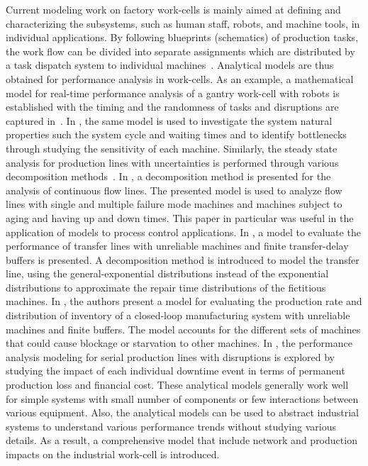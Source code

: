 Current modeling work on factory work-cells is mainly aimed at defining and characterizing the subsystems, such as human staff, robots, and machine tools, in individual applications. By following blueprints (schematics) of production tasks, the work flow can be divided into separate assignments which are distributed by a task dispatch system to individual machines~\cite{IkeaBot}. Analytical models are thus obtained for performance analysis in work-cells. As an example, a mathematical model for real-time performance analysis of a gantry work-cell with robots is established with the timing and the randomness of tasks and disruptions are captured in~\cite{8098604}. In \cite{Ou2017}, the same model is used to investigate the system natural properties such the system cycle and waiting times and to identify bottlenecks through studying the sensitivity of each machine. Similarly, the steady state analysis for production lines with uncertainties is performed through various decomposition methods~\cite{Colledani2013,doi:10.1080/00207543.2012.713137,doi:10.1080/00207540500385980}. In \cite{Colledani2013}, a decomposition method is presented for the analysis of continuous flow lines. The presented model is used to analyze flow lines with single and multiple failure mode machines and machines subject to aging and having up and down times.  This paper in particular was useful in the application of models to process control applications. In \cite{doi:10.1080/00207543.2012.713137}, a model to evaluate the performance of transfer lines with unreliable machines and finite transfer-delay buffers is presented. A decomposition method is introduced to model the transfer line, using the general-exponential distributions instead of the exponential distributions to approximate the repair time distributions of the fictitious machines. In \cite{doi:10.1080/00207540500385980}, the authors present a model for evaluating the production rate and distribution of inventory of a closed-loop manufacturing system with unreliable machines and finite buffers. The model accounts for the different sets of machines that could cause blockage or starvation to other machines. In \cite{QChang,Liu2012}, the performance analysis modeling for serial production lines with disruptions is explored by studying the impact of each individual downtime event in terms of permanent production loss and financial cost. These analytical models generally work well for simple systems with small number of components or few interactions between various equipment. Also, the analytical models can be used to abstract industrial systems to understand various performance trends without studying various details. As a result, a comprehensive model that include network and production impacts on the industrial work-cell is introduced.  

